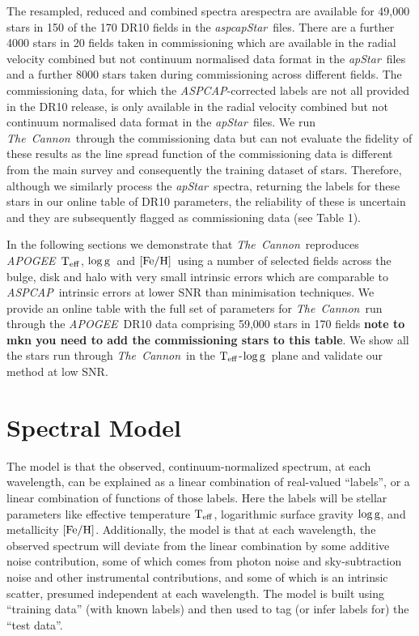 \documentclass[12pt, preprint]{aastex}
\newcommand{\teff}{\mbox{$\rm T_{eff}$}}
\newcommand{\feh}{\mbox{$\rm [Fe/H]$}}
\newcommand{\logg}{\mbox{$\rm \log g$}}
\newcommand{\tc}{\textsl{The~Cannon}}
\newcommand{\apogee}{\textsl{APOGEE}}
\newcommand{\aspcap}{\textsl{ASPCAP}}
\newcommand{\aspcapstar}{\textsl{aspcapStar}}
\newcommand{\apstar}{\textsl{apStar}}
\begin{document}
The resampled, reduced and combined spectra arespectra are available for 49,000 stars in 150 of the 170 DR10 fields in the \aspcapstar\ files. There are a further 4000 stars in 20 fields taken in commissioning which are available in the radial velocity combined but not continuum normalised data format in the \apstar\ files and a further 8000 stars taken during commissioning across different fields. The commissioning data, for which the \aspcap-corrected labels are not all provided in the DR10 release, is only available in the radial velocity combined but not continuum normalised data format in the \apstar\ files. We run \tc\ through the commissioning data but can not evaluate the fidelity of these results as the line spread function of the commissioning data is different from the main survey and consequently the training dataset of stars. Therefore, although we similarly process the \apstar\ spectra, returning the labels for these stars in our online table of DR10 parameters, the reliability of these is uncertain and they are subsequently flagged as commissioning data (see Table 1).



In the following sections we demonstrate that \tc\ reproduces \apogee\ \teff, \logg\ and \feh\ using a number of selected fields across the bulge, disk and halo with very small intrinsic errors which are comparable to \aspcap\ intrinsic errors at lower SNR than minimisation techniques. We provide an online table with the full set of parameters for \tc\ run through the \apogee\ DR10 data comprising 59,000 stars in 170 fields \textbf{note to mkn you need to add the commissioning stars to this table}.  We show all the stars run through \tc\ in the \teff-\logg\ plane and validate our method at low SNR.



\section{Spectral Model}
\label{sec:spectralmodel}

The model is that the observed, continuum-normalized spectrum, at each
wavelength, can be explained as a linear combination of real-valued
``labels'', or a linear combination of functions of those labels.
Here the labels will be stellar parameters like effective temperature $\teff$,
logarithmic surface gravity $\logg$, and metallicity $\feh$.
Additionally, the model is that at each wavelength, the observed
spectrum will deviate from the linear combination by some additive
noise contribution, some of which comes from photon noise and
sky-subtraction noise and other instrumental contributions, and some
of which is an intrinsic scatter, presumed independent at each
wavelength.
The model is built using ``training data'' (with known labels) and then
used to tag (or infer labels for) the ``test data''.
\end{document}
